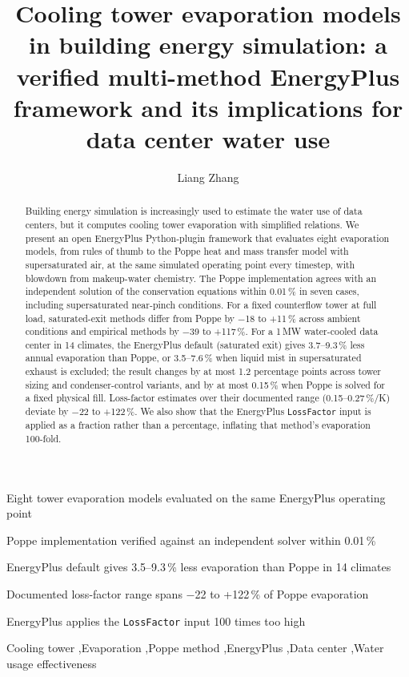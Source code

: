 \documentclass[preprint,12pt,authoryear]{elsarticle}
\newcommand{\tbd}[1]{\textcolor{red}{[#1]}}
\begin{document}
\begin{frontmatter}
\title{Cooling tower evaporation models in building energy simulation: a verified multi-method EnergyPlus framework
and its implications for data center water use}

\author{Liang Zhang}
\address{Department of Civil and Architectural Engineering and Mechanics, University of Arizona, Tucson, AZ, USA \tbd{confirm affiliation}}

\begin{abstract}
Building energy simulation is increasingly used to estimate the water use of data centers, but it computes cooling
tower evaporation with simplified relations. We present an open EnergyPlus Python-plugin framework that evaluates eight
evaporation models, from rules of thumb to the Poppe heat and mass transfer model with supersaturated air, at the same
simulated operating point every timestep, with blowdown from makeup-water chemistry. The Poppe implementation agrees with
an independent solution of the conservation equations within 0.01\,\% in seven cases, including supersaturated
near-pinch conditions. For a fixed counterflow tower at full load, saturated-exit methods differ from Poppe by $-$18 to
+11\,\% across ambient conditions and empirical methods by $-$39 to +117\,\%. For a 1\,MW water-cooled data center in
14 climates, the EnergyPlus default (saturated exit) gives 3.7--9.3\,\% less annual evaporation than Poppe, or 3.5--7.6\,\%
when liquid mist in supersaturated exhaust is excluded; the result changes by at most 1.2 percentage points across tower
sizing and condenser-control variants, and by at most 0.15\,\% when Poppe is solved for a fixed physical fill.
Loss-factor estimates over their documented range (0.15--0.27\,\%/K) deviate by $-$22 to +122\,\%. We also show that
the EnergyPlus \texttt{LossFactor} input is applied as a fraction rather than a percentage, inflating that method's
evaporation 100-fold.
\end{abstract}

\begin{highlights}
\item Eight tower evaporation models evaluated on the same EnergyPlus operating point
\item Poppe implementation verified against an independent solver within 0.01\,\%
\item EnergyPlus default gives 3.5--9.3\,\% less evaporation than Poppe in 14 climates
\item Documented loss-factor range spans $-$22 to +122\,\% of Poppe evaporation
\item EnergyPlus applies the \texttt{LossFactor} input 100 times too high
\end{highlights}

\begin{keyword}
Cooling tower \sep Evaporation \sep Poppe method \sep EnergyPlus \sep Data center \sep Water usage effectiveness
\end{keyword}
\end{frontmatter}
\end{document}
